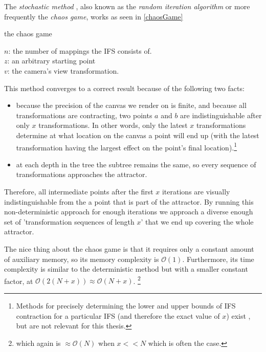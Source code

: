 \documentclass[11pt]{article}
\begin{document}
The \emph{stochastic method} \cite{hepting1991rendering}, also known as the \emph{random iteration algorithm} \cite{barnsley1988fractals} or more frequently the \emph{chaos game}, works as seen in \autoref{chaosGame}

\begin{algorithm}
\caption{the chaos game}
\label{chaosGame}
  $n$: the number of mappings the IFS consists of. \\
  $z$: an arbitrary starting point \\
  $v$: the camera's view transformation. \\

\end{algorithm}

This method converges to a correct result because of the following two facts:

\begin{itemize}
\item because the precision of the canvas we render on is finite, and because all transformations are contracting,
two points \(a\) and \(b\) are indistinguishable after only \(x\) transformations.
 In other words, only the latest \(x\) transformations determine at what location on the canvas a point will end up (with the latest transformation having the largest effect on the point's final location).\footnote{Methods for precisely determining the lower and upper bounds of IFS contraction for a particular IFS (and therefore the exact value of \(x\)) exist \cite{hepting1991rendering}, 
but are not relevant for this thesis.}
\item at each depth in the tree the subtree remains the same, so every sequence of transformations approaches the attractor.
\end{itemize}

Therefore, all intermediate points after the first \(x\) iterations are visually indistinguishable from the a point that is part of the attractor.
By running this non-deterministic approach for enough iterations we approach a diverse enough set of 'transformation sequences of length \(x\)' that we end up covering the whole attractor.

The nice thing about the chaos game is that it requires only a constant amount of auxiliary memory, so its memory complexity is \(\mathcal{O}(1)\).
Furthermore, its time complexity is similar to the deterministic method but with a smaller constant factor, at \(\mathcal{O}(2(N + x)) \approx \mathcal{O}(N + x)\). \footnote{which again is \(\approx \mathcal{O}(N)\) when \(x << N\) which is often the case.}
\end{document}
